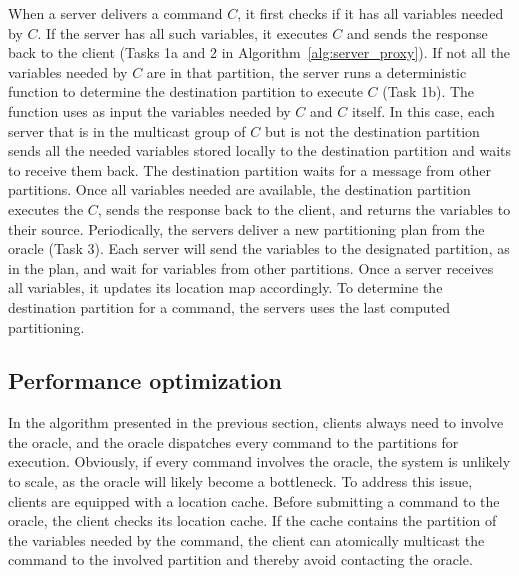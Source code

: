 When a server delivers a command $C$, it first checks if it has all variables needed by $C$. If the server has all such variables, it executes $C$ and sends the response back to the client (Tasks 1a and 2 in Algorithm~\ref{alg:server_proxy}).
If not all the variables needed by $C$ are in that partition, the server runs a deterministic function to determine the destination partition to execute $C$ (Task 1b). The function uses as input the variables needed by $C$ and $C$ itself.
In this case, each server that is in the multicast group of $C$ but is not the destination partition sends all the needed variables stored locally to the destination partition and waits to receive them back. 
The destination partition waits for a message from other partitions. Once all variables needed are available, the destination partition executes the $C$, sends the response back to the client, and returns the variables to their source.
Periodically, the servers deliver a new partitioning plan from the oracle (Task 3). Each server will send the variables to the designated partition, as in the plan, and wait for variables from other partitions. Once a server receives all variables, it updates its location map accordingly.
To determine the destination partition for a command, the servers uses the last computed partitioning.


\subsection{Performance optimization}
\label{sec:optm}

%
In the algorithm presented in the previous section, clients always need to involve the oracle, and the oracle dispatches every command to the partitions for execution.
Obviously, if every command involves the oracle, the system is unlikely to scale, as the oracle will likely become a bottleneck.
To address this issue, clients are equipped with a location cache.
Before submitting a command to the oracle, the client checks its location cache.
If the cache contains the partition of the variables needed by the command, the client can atomically multicast the command to the involved partition and thereby avoid contacting the oracle. 


